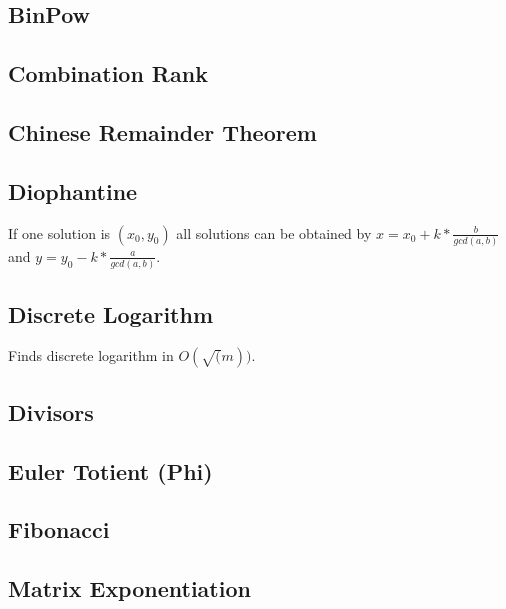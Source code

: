 \subsection{BinPow}

\subsection{Combination Rank}

\subsection{Chinese Remainder Theorem}

\subsection{Diophantine}
If one solution is $(x_0, y_0)$ all solutions can be obtained by $x = x_0  +k  * \frac{b}{gcd(a, b)}$ and $y= y_0 -k *\frac{a}{gcd(a, b)}$.

\subsection{Discrete Logarithm}
Finds discrete logarithm in $O(\sqrt(m))$.

\subsection{Divisors}

\subsection{Euler Totient (Phi)}

\subsection{Fibonacci}



\subsection{Matrix Exponentiation}


